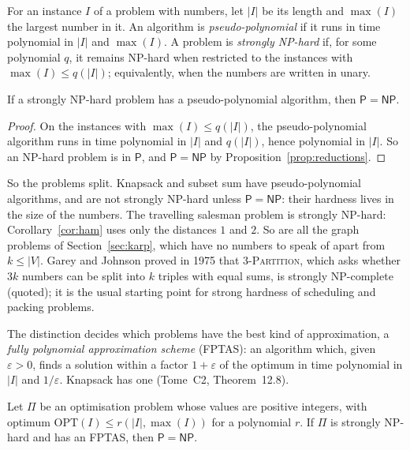 \begin{definition}\label{def:strong}
For an instance $I$ of a problem with numbers, let $|I|$ be its length and $\max(I)$ the largest number in it. An algorithm is \emph{pseudo-polynomial} if it runs in time polynomial in $|I|$ and $\max(I)$. A problem is \emph{strongly NP-hard} if, for some polynomial $q$, it remains NP-hard when restricted to the instances with $\max(I)\le q(|I|)$; equivalently, when the numbers are written in unary.
\end{definition}

\begin{proposition}\label{prop:strongpseudo}
If a strongly NP-hard problem has a pseudo-polynomial algorithm, then $\mathsf P=\mathsf{NP}$.
\end{proposition}

\begin{proof}
On the instances with $\max(I)\le q(|I|)$, the pseudo-polynomial algorithm runs in time polynomial in $|I|$ and $q(|I|)$, hence polynomial in $|I|$. So an NP-hard problem is in $\mathsf P$, and $\mathsf P=\mathsf{NP}$ by Proposition~\ref{prop:reductions}.
\end{proof}

So the problems split. Knapsack and subset sum have pseudo-polynomial algorithms, and are not strongly NP-hard unless $\mathsf P=\mathsf{NP}$: their hardness lives in the size of the numbers. The travelling salesman problem is strongly NP-hard: Corollary~\ref{cor:ham} uses only the distances $1$ and $2$. So are all the graph problems of Section~\ref{sec:karp}, which have no numbers to speak of apart from $k\le|V|$. Garey and Johnson proved in 1975 that \textup{\textsc{3-Partition}}, which asks whether $3k$ numbers can be split into $k$ triples with equal sums, is strongly NP-complete (quoted); it is the usual starting point for strong hardness of scheduling and packing problems.

The distinction decides which problems have the best kind of approximation, a \emph{fully polynomial approximation scheme} (FPTAS): an algorithm which, given $\varepsilon>0$, finds a solution within a factor $1+\varepsilon$ of the optimum in time polynomial in $|I|$ and $1/\varepsilon$. Knapsack has one (Tome~C2, Theorem~12.8).

\begin{proposition}\label{prop:nofptas}
Let $\Pi$ be an optimisation problem whose values are positive integers, with optimum $\mathrm{OPT}(I)\le r(|I|,\max(I))$ for a polynomial $r$. If $\Pi$ is strongly NP-hard and has an FPTAS, then $\mathsf P=\mathsf{NP}$.
\end{proposition}

